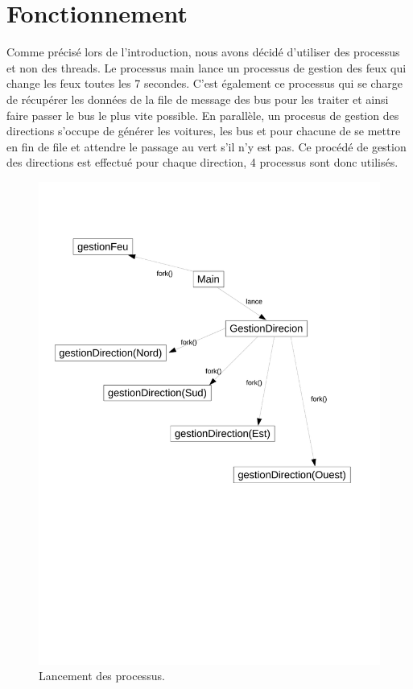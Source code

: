 \section{Fonctionnement}
Comme précisé lors de l'introduction, nous avons décidé d'utiliser des processus et non des threads. Le processus main lance un processus de gestion des feux qui change les feux toutes les 7 secondes. C'est également ce processus qui se charge de récupérer les données de la file de message des bus pour les traiter et ainsi faire passer le bus le plus vite possible. En parallèle, un procesus de gestion des directions s'occupe de générer les voitures, les bus et pour chacune de se mettre en fin de file et attendre le passage au vert s'il n'y est pas. Ce procédé de gestion des directions est effectué pour chaque direction, 4 processus sont donc utilisés.

\begin{figure}[htb!]
\centering
\includegraphics[scale=0.5]{graphe3LO41.pdf}

\caption{Lancement des processus.}
\end{figure}

